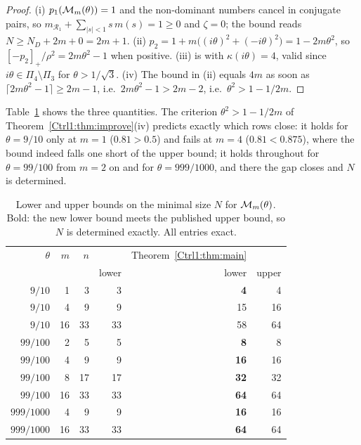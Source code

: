 \begin{proof}
(i) $p_1(\mathcal{M}_m(\theta))=1$ and the non-dominant numbers cancel in conjugate pairs, so
$m_{\mathcal R_1}+\sum_{|s|<1}s\,m(s)=1\ge0$ and $\zeta=0$; the bound reads
$N\ge N_D+2m+0=2m+1$. (ii) $p_2=1+m\bigl((i\theta)^{2}+(-i\theta)^{2}\bigr)=1-2m\theta^{2}$,
so $[-p_2]_+/\rho^{2}=2m\theta^{2}-1$ when positive. (iii) is \cite[Thm.~4.4]{Ben20ELA}
with $\kappa(i\theta)=4$, valid since $i\theta\in\Pi_4\setminus\Pi_3$ for
$\theta>1/\sqrt3$. (iv) The bound in (ii) equals $4m$ as soon as
$\lceil2m\theta^{2}-1\rceil\ge2m-1$, i.e.\ $2m\theta^{2}-1>2m-2$, i.e.\
$\theta^{2}>1-1/2m$.
\end{proof}

Table~\ref{Ctrl1:tab:improve} shows the three quantities. The criterion $\theta^{2}>1-1/2m$ of
Theorem~\ref{Ctrl1:thm:improve}(iv) predicts exactly which rows close: it holds for
$\theta=9/10$ only at $m=1$ ($0.81>0.5$) and fails at $m=4$ ($0.81<0.875$), where the bound
indeed falls one short of the upper bound; it holds throughout for $\theta=99/100$ from
$m=2$ on and for $\theta=999/1000$, and there the gap closes and $N$ is determined.

\begin{table}[ht]
\centering\small
\begin{tabular}{rrrrrr}
\toprule
$\theta$ & $m$ & $n$ & \cite[Thm.~4.7]{Ben20ELA} & Theorem~\ref{Ctrl1:thm:main} & \cite[Thm.~4.4]{Ben20ELA}\\
 & & & lower & lower & upper\\
\midrule
$9/10$      &  1 &  3 &  3 &  \textbf{4} &  4\\
$9/10$      &  4 &  9 &  9 & 15 & 16\\
$9/10$      & 16 & 33 & 33 & 58 & 64\\
\midrule
$99/100$    &  2 &  5 &  5 &  \textbf{8} &  8\\
$99/100$    &  4 &  9 &  9 & \textbf{16} & 16\\
$99/100$    &  8 & 17 & 17 & \textbf{32} & 32\\
$99/100$    & 16 & 33 & 33 & \textbf{64} & 64\\
\midrule
$999/1000$  &  4 &  9 &  9 & \textbf{16} & 16\\
$999/1000$  & 16 & 33 & 33 & \textbf{64} & 64\\
\bottomrule
\end{tabular}
\caption{Lower and upper bounds on the minimal size $N$ for $\mathcal{M}_m(\theta)$. Bold: the new
lower bound meets the published upper bound, so $N$ is determined exactly. All entries
exact.}
\label{Ctrl1:tab:improve}
\end{table}

